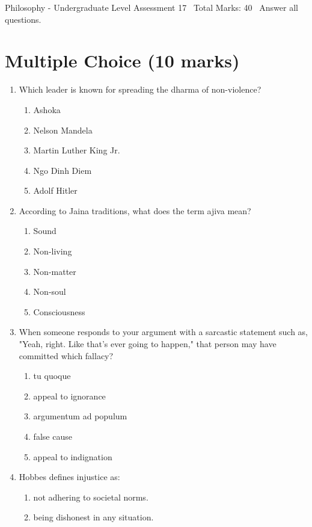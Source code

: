 \documentclass[12pt]{article}
\begin{document}
\begin{center}
Philosophy - Undergraduate Level Assessment 17 \
Total Marks: 40 \
Answer all questions.
\end{center}

\section*{Multiple Choice (10 marks)}
\begin{enumerate}[label=\arabic*.]
\item Which leader is known for spreading the dharma of non-violence?
\begin{enumerate}[label=(\alph*)]
    \item Ashoka
    \item Nelson Mandela
    \item Martin Luther King Jr.
    \item Ngo Dinh Diem
    \item Adolf Hitler
\end{enumerate}
\item According to Jaina traditions, what does the term ajiva mean?
\begin{enumerate}[label=(\alph*)]
    \item Sound
    \item Non-living
    \item Non-matter
    \item Non-soul
    \item Consciousness
\end{enumerate}
\item When someone responds to your argument with a sarcastic statement such as, "Yeah, right. Like that's ever going to happen," that person may have committed which fallacy?
\begin{enumerate}[label=(\alph*)]
    \item tu quoque
    \item appeal to ignorance
    \item argumentum ad populum
    \item false cause
    \item appeal to indignation
\end{enumerate}
\item Hobbes defines injustice as:
\begin{enumerate}[label=(\alph*)]
    \item not adhering to societal norms.
    \item being dishonest in any situation.

\end{enumerate}
\end{enumerate}
\end{document}
